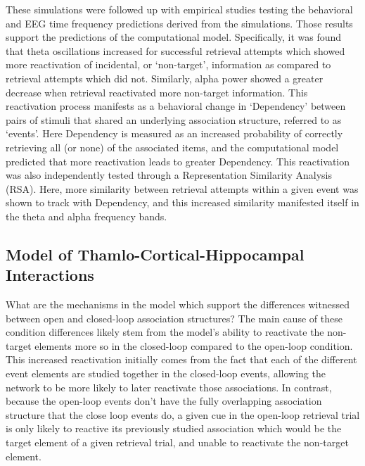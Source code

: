 \documentclass[11pt, titlepage, twoside]{article}
\begin{document}
These simulations were followed up with empirical studies testing the behavioral and EEG time frequency predictions derived from the simulations.  %
Those results support the predictions of the computational model.  Specifically, it was found that theta oscillations increased for successful retrieval attempts which showed more reactivation of incidental, or `non-target', information as compared to retrieval attempts which did not.  Similarly, alpha power showed a greater decrease when retrieval reactivated more non-target information.  This reactivation process manifests as a behavioral change in `Dependency' between pairs of stimuli that shared an underlying association structure, referred to as `events'.  Here Dependency is measured as an increased probability of correctly retrieving all (or none) of the associated items, and the computational model predicted that more reactivation leads to greater Dependency.  This reactivation was also independently tested through a Representation Similarity Analysis (RSA).  Here, more similarity between retrieval attempts within a given event was shown to track with Dependency, and this increased similarity manifested itself in the theta and alpha frequency bands.

\subsection{Model of Thamlo-Cortical-Hippocampal Interactions}

What are the mechanisms in the model which support the differences witnessed between open and closed-loop association structures? The main cause of these condition differences likely stem from the model's ability to reactivate the non-target elements more so in the closed-loop compared to the open-loop condition.  This increased reactivation initially comes from the fact that each of the different event elements are studied together in the closed-loop events, allowing the network to be more likely to later reactivate those associations.  In contrast, because the open-loop events don't have the fully overlapping association structure that the close loop events do, a given cue in the open-loop retrieval trial is only likely to reactive its previously studied association which would be the target element of a given retrieval trial, and unable to reactivate the non-target element.  
\end{document}
